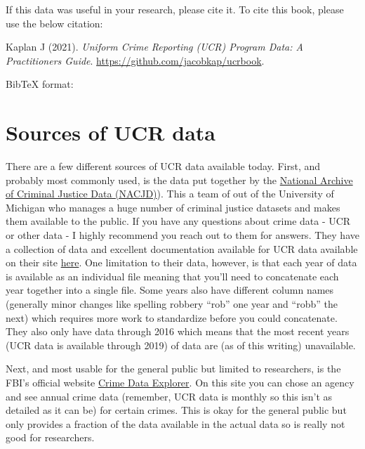 \documentclass[
  12pt,
  openany]{book}
\begin{document}
If this data was useful in your research, please cite it. To cite this book, please use the below citation:

Kaplan J (2021). \emph{Uniform Crime Reporting (UCR) Program Data: A Practitioners Guide}. \url{https://github.com/jacobkap/ucrbook}.

BibTeX format:

\hypertarget{sources-of-ucr-data}{%
\section*{Sources of UCR data}\label{sources-of-ucr-data}}


There are a few different sources of UCR data available today. First, and probably most commonly used, is the data put together by the \href{https://www.icpsr.umich.edu/web/pages/NACJD/index.html}{National Archive of Criminal Justice Data (NACJD)}). This a team of out of the University of Michigan who manages a huge number of criminal justice datasets and makes them available to the public. If you have any questions about crime data - UCR or other data - I highly recommend you reach out to them for answers. They have a collection of data and excellent documentation available for UCR data available on their site \href{https://www.icpsr.umich.edu/web/NACJD/series/57}{here}. One limitation to their data, however, is that each year of data is available as an individual file meaning that you'll need to concatenate each year together into a single file. Some years also have different column names (generally minor changes like spelling robbery ``rob'' one year and ``robb'' the next) which requires more work to standardize before you could concatenate. They also only have data through 2016 which means that the most recent years (UCR data is available through 2019) of data are (as of this writing) unavailable.

Next, and most usable for the general public but limited to researchers, is the FBI's official website \href{https://crime-data-explorer.fr.cloud.gov/}{Crime Data Explorer}. On this site you can chose an agency and see annual crime data (remember, UCR data is monthly so this isn't as detailed as it can be) for certain crimes. This is okay for the general public but only provides a fraction of the data available in the actual data so is really not good for researchers.
\end{document}
